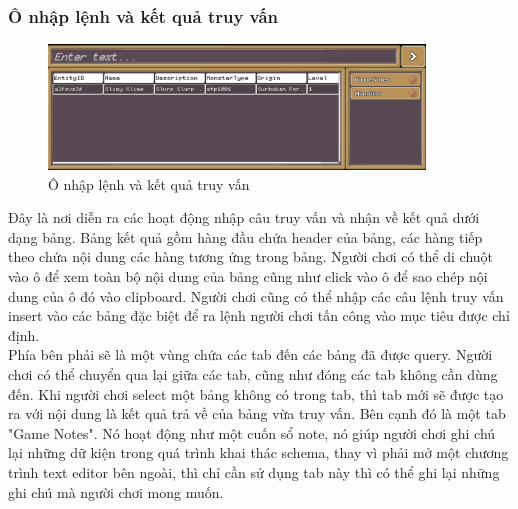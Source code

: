 \subsubsection{Ô nhập lệnh và kết quả truy vấn}
\begin{figure}[H]
	\centering
	\includegraphics[width=10cm]{Images/CommandBox.png}
	\vspace{0.5cm}
	\caption{Ô nhập lệnh và kết quả truy vấn}
\end{figure}
\hspace*{0.5cm} Đây là nơi diễn ra các hoạt động nhập câu truy vấn và nhận về kết quả dưới dạng bảng. Bảng kết quả gồm hàng đầu chứa header của bảng, các hàng tiếp theo chứa nội dung các hàng tương ứng trong bảng. Người chơi có thể di chuột vào ô để xem toàn bộ nội dung của bảng cũng như click vào ô để sao chép nội dung của ô đó vào clipboard. Người chơi cũng có thể nhập các câu lệnh truy vấn insert vào các bảng đặc biệt để ra lệnh người chơi tấn công vào mục tiêu được chỉ định.\\
\hspace*{0.5cm} Phía bên phải sẽ là một vùng chứa các tab đến các bảng đã được query. Người chơi có thể chuyển qua lại giữa các tab, cũng như đóng các tab không cần dùng đến. Khi người chơi select một bảng không có trong tab, thì tab mới sẽ được tạo ra với nội dung là kết quả trả về của bảng vừa truy vấn.
\hspace*{0.5cm} Bên cạnh đó là một tab "Game Notes". Nó hoạt động như một cuốn sổ note, nó giúp người chơi ghi chú lại những dữ kiện trong quá trình khai thác schema, thay vì phải mở một chương trình text editor bên ngoài, thì chỉ cần sử dụng tab này thì có thể ghi lại những ghi chú mà người chơi mong muốn.
